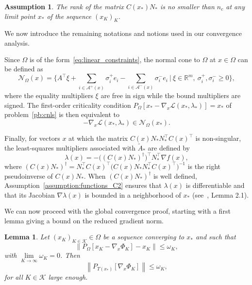\documentclass{article}
\numberwithin{equation}{section}
\newcommand{\RR}{{\mathbb{R}}} %
\newcommand{\calA}{{\mathcal{A}}}
\newcommand{\calL}{{\mathcal{L}}}
\newcommand{\calK}{{\mathcal{K}}}
\newcommand{\calN}{{\mathcal{N}}}
\newcommand{\proj}[2]{P_{#1} \left[ {#2} \right]} %
\theoremstyle{plain}
\newtheorem{lemma}[theorem]{Lemma}
\newtheorem{assumption}{Assumption}
\begin{document}
	\begin{assumption}\label{assumption:cq_null_space_jacobian}
		The rank of the matrix $C(x_*)N_*$ is no smaller than $n_c$ at any limit point $x_*$ of the sequence $(x_K)_K$.
	\end{assumption}
	
	We now introduce the remaining notations and notions used in our convergence analysis.
	
	Since $\Omega$ is of the form~\eqref{eq:linear_constraints}, the normal cone to $\Omega$ at $x \in \Omega$ can be defined as
	\begin{equation}\label{eq:normal_cone}
		\calN_\Omega(x) = \bigg\{ A^\top\xi + \sum_{i \in \calA^+(x)} \sigma^+_i e_i - \sum_{i \in \calA^-(x)} \sigma^-_i e_i \ \Big|\ \xi\in\RR^m,\ \sigma^+_i, \sigma^-_i\ge0\bigg\},
	\end{equation}
	where the equality multipliers $\xi$ are free in sign while the bound multipliers are signed. The first-order criticality condition $\proj{\Omega}{x_*-\nabla_x\calL(x_*,\lambda_*)}=x_*$ of problem~\eqref{pb:cnls} is then equivalent to
	\[-\nabla_x\calL(x_*,\lambda_*)\in \calN_\Omega(x_*).\]
	
	Finally, for vectors $x$ at which the matrix $C(x)N_* N_*^\top C(x)^\top$ is non-singular, the least-squares multipliers associated with $\tilde A_*$ are defined by
	\begin{equation}\label{eq:least-squares_mult}
		\lambda(x) = -\big((C(x)N_*)^\dagger\big)^\top N_*^\top\nabla f(x),
	\end{equation}
	where $(C(x)N_*)^\dagger = N_*^\top C(x)^\top\big(C(x)N_* N_*^\top C(x)^\top\big)^{-1}$ is the right pseudoinverse of $C(x)N_*$. When $(C(x)N_*)^\dagger $ is well defined, Assumption~\ref{assumption:functions_C2} ensures that $\lambda(x)$ is differentiable and that its Jacobian $\nabla\lambda(x)$ is bounded in a neighborhood of $x_*$ (see~\cite{conn-etal:1996b}, Lemma 2.1).
	
	We can now proceed with the global convergence proof, starting with a first lemma giving a bound on the reduced gradient norm.
	\begin{lemma}\label{lemma:bound_proj_algrad_sol_nullspace}
		Let $\left(x_K\right)_{K\in \calK} \in \Omega$ be a sequence converging to $x_*$ and such that
		\[\left\| \proj{\Omega}{x_K - \nabla_x \Phi_K}-x_K \right\| \le \omega_K,\]
		with $\lim\limits_{K\to \infty} \omega_K = 0$. Then
		\begin{equation*}
			\left\| \proj{T(x_*)}{\nabla_x \Phi_K} \right\| \le  \omega_K,
		\end{equation*}
		for all $K\in \calK$ large enough.
	\end{lemma}
	
\end{document}
